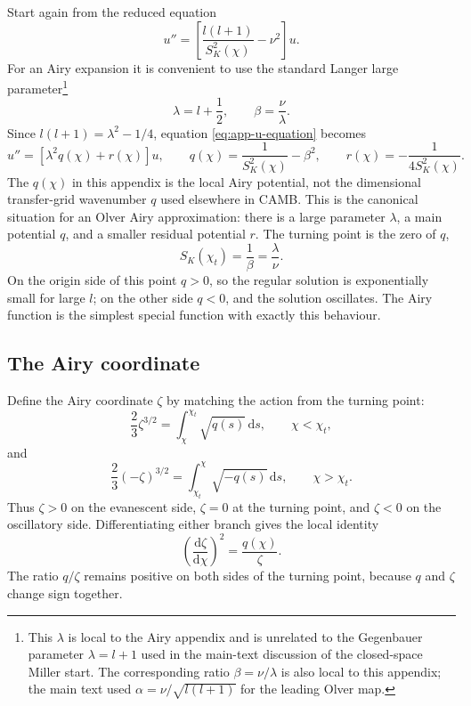 \documentclass[11pt,a4paper]{article}
\newcommand{\dd}{\mathrm{d}}
\newcommand{\SK}{S_K}
\begin{document}
Start again from the reduced equation
\begin{equation}
  u''=\left[\frac{l(l+1)}{\SK^2(\chi)}-\nu^2\right]u.
  \label{eq:app-u-equation}
\end{equation}
For an Airy expansion it is convenient to use the standard Langer large
parameter\footnote{This \(\lambda\) is local to the Airy appendix and is
unrelated to the Gegenbauer parameter \(\lambda=l+1\) used in the main-text
discussion of the closed-space Miller start.  The corresponding ratio
\(\beta=\nu/\lambda\) is also local to this appendix; the main text used
\(\alpha=\nu/\sqrt{l(l+1)}\) for the leading Olver map.}
\begin{equation}
  \lambda=l+\frac12,\qquad
  \beta=\frac{\nu}{\lambda}.
\end{equation}
Since \(l(l+1)=\lambda^2-1/4\), equation
\eqref{eq:app-u-equation} becomes
\begin{equation}
  u''=\left[\lambda^2 q(\chi)+r(\chi)\right]u,
  \qquad
  q(\chi)=\frac{1}{\SK^2(\chi)}-\beta^2,\qquad
  r(\chi)=-\frac{1}{4\SK^2(\chi)}.
  \label{eq:app-airy-start}
\end{equation}
The \(q(\chi)\) in this appendix is the local Airy potential, not the
dimensional transfer-grid wavenumber \(q\) used elsewhere in CAMB.
This is the canonical situation for an Olver Airy approximation: there is a
large parameter \(\lambda\), a main potential \(q\), and a smaller residual
potential \(r\).  The turning point is the zero of \(q\),
\begin{equation}
  \SK(\chi_t)=\frac{1}{\beta}=\frac{\lambda}{\nu}.
  \label{eq:app-airy-turn}
\end{equation}
On the origin side of this point \(q>0\), so the regular solution is
exponentially small for large \(l\); on the other side \(q<0\), and the solution
oscillates.  The Airy function is the simplest special function with exactly
this behaviour.

\subsection{The Airy coordinate}

Define the Airy coordinate \(\zeta\) by matching the action from the turning
point:
\begin{equation}
  \frac23\zeta^{3/2}=
  \int_{\chi}^{\chi_t}\sqrt{q(s)}\,\dd s,\qquad \chi<\chi_t,
  \label{eq:app-zeta-positive}
\end{equation}
and
\begin{equation}
  \frac23(-\zeta)^{3/2}=
  \int_{\chi_t}^{\chi}\sqrt{-q(s)}\,\dd s,\qquad \chi>\chi_t.
  \label{eq:app-zeta-negative}
\end{equation}
Thus \(\zeta>0\) on the evanescent side, \(\zeta=0\) at the turning point, and
\(\zeta<0\) on the oscillatory side.  Differentiating either branch gives the
local identity
\begin{equation}
  \left(\frac{\dd\zeta}{\dd\chi}\right)^2=\frac{q(\chi)}{\zeta}.
  \label{eq:app-zeta-identity}
\end{equation}
The ratio \(q/\zeta\) remains positive on both sides of the turning point,
because \(q\) and \(\zeta\) change sign together.
\end{document}
